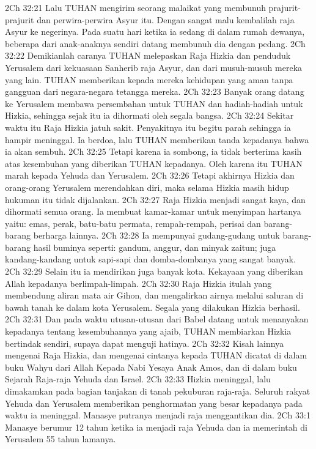2Ch 32:21  Lalu TUHAN mengirim seorang malaikat yang membunuh prajurit-prajurit dan perwira-perwira Asyur itu. Dengan sangat malu kembalilah raja Asyur ke negerinya. Pada suatu hari ketika ia sedang di dalam rumah dewanya, beberapa dari anak-anaknya sendiri datang membunuh dia dengan pedang.
2Ch 32:22  Demikianlah caranya TUHAN melepaskan Raja Hizkia dan penduduk Yerusalem dari kekuasaan Sanherib raja Asyur, dan dari musuh-musuh mereka yang lain. TUHAN memberikan kepada mereka kehidupan yang aman tanpa gangguan dari negara-negara tetangga mereka.
2Ch 32:23  Banyak orang datang ke Yerusalem membawa persembahan untuk TUHAN dan hadiah-hadiah untuk Hizkia, sehingga sejak itu ia dihormati oleh segala bangsa.
2Ch 32:24  Sekitar waktu itu Raja Hizkia jatuh sakit. Penyakitnya itu begitu parah sehingga ia hampir meninggal. Ia berdoa, lalu TUHAN memberikan tanda kepadanya bahwa ia akan sembuh.
2Ch 32:25  Tetapi karena ia sombong, ia tidak berterima kasih atas kesembuhan yang diberikan TUHAN kepadanya. Oleh karena itu TUHAN marah kepada Yehuda dan Yerusalem.
2Ch 32:26  Tetapi akhirnya Hizkia dan orang-orang Yerusalem merendahkan diri, maka selama Hizkia masih hidup hukuman itu tidak dijalankan.
2Ch 32:27  Raja Hizkia menjadi sangat kaya, dan dihormati semua orang. Ia membuat kamar-kamar untuk menyimpan hartanya yaitu: emas, perak, batu-batu permata, rempah-rempah, perisai dan barang-barang berharga lainnya.
2Ch 32:28  Ia mempunyai gudang-gudang untuk barang-barang hasil buminya seperti: gandum, anggur, dan minyak zaitun; juga kandang-kandang untuk sapi-sapi dan domba-dombanya yang sangat banyak.
2Ch 32:29  Selain itu ia mendirikan juga banyak kota. Kekayaan yang diberikan Allah kepadanya berlimpah-limpah.
2Ch 32:30  Raja Hizkia itulah yang membendung aliran mata air Gihon, dan mengalirkan airnya melalui saluran di bawah tanah ke dalam kota Yerusalem. Segala yang dilakukan Hizkia berhasil.
2Ch 32:31  Dan pada waktu utusan-utusan dari Babel datang untuk menanyakan kepadanya tentang kesembuhannya yang ajaib, TUHAN membiarkan Hizkia bertindak sendiri, supaya dapat menguji hatinya.
2Ch 32:32  Kisah lainnya mengenai Raja Hizkia, dan mengenai cintanya kepada TUHAN dicatat di dalam buku Wahyu dari Allah Kepada Nabi Yesaya Anak Amos, dan di dalam buku Sejarah Raja-raja Yehuda dan Israel.
2Ch 32:33  Hizkia meninggal, lalu dimakamkan pada bagian tanjakan di tanah pekuburan raja-raja. Seluruh rakyat Yehuda dan Yerusalem memberikan penghormatan yang besar kepadanya pada waktu ia meninggal. Manasye putranya menjadi raja menggantikan dia.
2Ch 33:1  Manasye berumur 12 tahun ketika ia menjadi raja Yehuda dan ia memerintah di Yerusalem 55 tahun lamanya.
